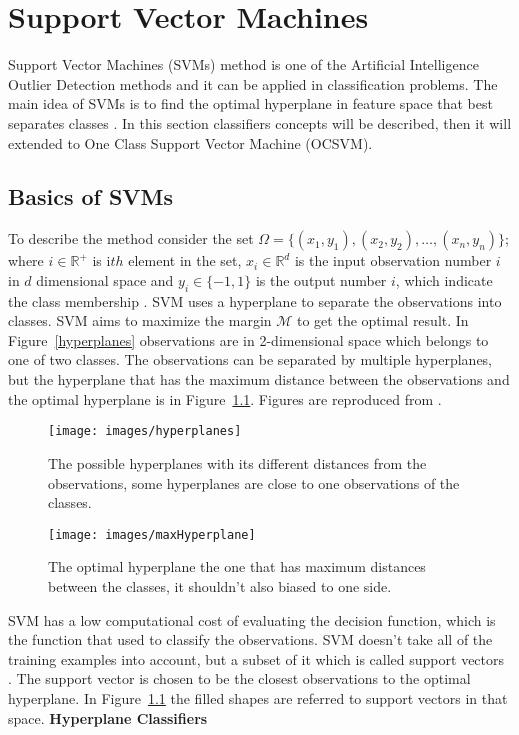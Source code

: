 \chapter{Support Vector Machines} \label{Support_Vector_Machine}
Support Vector Machines (SVMs) method is one of the Artificial Intelligence Outlier Detection methods \citep{Silvia} and it can be applied in classification problems. The main idea of SVMs is to find the optimal hyperplane in feature space that best separates classes \citep{Maimon}. In this section classifiers concepts will be described, then it will extended to One Class Support Vector Machine (OCSVM).
\section{Basics of SVMs}
To describe the method consider the set $\Omega = \lbrace (x_1,y_1),(x_2,y_2),\ldots,(x_n,y_n) \rbrace$; where $i \in \mathbb{R}^{+}$ is i$th$ element in the set, $x_i \in \mathbb{R}^d$ is the input observation number $i$ in $d$ dimensional space and $y_i \in \lbrace -1,1 \rbrace$ is the output number $i$, which indicate the class membership \citep{Roemer}. SVM uses a hyperplane to separate the observations into classes.
SVM aims to maximize the margin $\mathcal{M}$ to get the optimal result. In Figure~\ref{hyperplanes} observations are in 2-dimensional space which belongs to one of two classes. The observations can be separated by multiple hyperplanes, but the hyperplane that has the maximum distance between the observations and the optimal hyperplane is in Figure~\ref{maxHyperplane}. Figures are reproduced from \citep{SVM}.
\begin{figure}[H]
\begin{center}
  \texttt{[image: images/hyperplanes]}
  \caption{The possible hyperplanes with its different distances from the observations, some hyperplanes are close to one observations of the classes.}
  \label{hyperplanes}
\endminipage
\qquad
{}
  \texttt{[image: images/maxHyperplane]}
  \caption{The optimal hyperplane the one that has maximum distances between the classes, it shouldn't also biased to one side.}
  \label{maxHyperplane}
\endminipage
\end{center}
\end{figure}
SVM has a low computational cost of evaluating the decision function, which is the function that used to classify the observations. SVM doesn't take all of the training examples into account, but a subset of it which is called support vectors \citep{Maimon}. The support vector is chosen to be the closest observations to the optimal hyperplane. In Figure~\ref{maxHyperplane} the filled shapes are referred to support vectors in that space. 
\newpage
\large{\textbf{Hyperplane Classifiers}}

